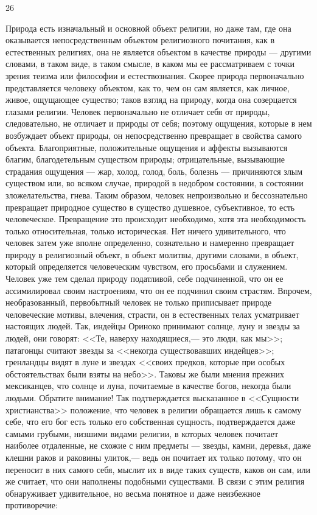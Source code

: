 \documentclass[12pt]{article}
\begin{document}
26

Природа есть изначальный и основной объект религии, но даже там, где она оказывается непосредственным объектом религиозного почитания, как в естественных религиях, она не является объектом в качестве природы --- другими словами, в таком виде, в таком смысле, в каком мы ее рассматриваем с точки зрения теизма или философии и естествознания. Скорее природа первоначально представляется человеку объектом, как то, чем он сам является, как личное, живое, ощущающее существо; таков взгляд на природу, когда она созерцается глазами религии. Человек первоначально не отличает себя от природы, следовательно, не отличает и природы от себя; поэтому ощущения, которые в нем возбуждает объект природы, он непосредственно превращает в свойства самого объекта. Благоприятные, положительные ощущения и аффекты вызываются благим, благодетельным существом природы; отрицательные, вызывающие страдания ощущения --- жар, холод, голод, боль, болезнь --- причиняются злым существом или, во всяком случае, природой в недобром состоянии, в состоянии зложелательства, гнева. Таким образом, человек непроизвольно и бессознательно превращает природное существо в существо душевное, субъективное, то есть человеческое. Превращение это происходит необходимо, хотя эта необходимость только относительная, только историческая. Нет ничего удивительного, что человек затем уже вполне определенно, сознательно и намеренно превращает природу в религиозный объект, в объект молитвы, другими словами, в объект, который определяется человеческим чувством, его просьбами и служением. Человек уже тем сделал природу податливой, себе подчиненной, что он ее ассимилировал своим настроениям, что он ее подчинил своим страстям. Впрочем, необразованный, первобытный человек не только приписывает природе человеческие мотивы, влечения, страсти, он в естественных телах усматривает настоящих людей. Так, индейцы Ориноко принимают солнце, луну и звезды за людей, они говорят: <<Те, наверху находящиеся,--- это люди, как мы>>; патагонцы считают звезды за <<некогда существовавших индейцев>>; гренландцы видят в луне и звездах <<своих предков, которые при особых обстоятельствах были взяты на небо>>. Таковы же были мнения прежних мексиканцев, что солнце и луна, почитаемые в качестве богов, некогда были людьми. Обратите внимание! Так подтверждается высказанное в <<Сущности христианства>> положение, что человек в религии обращается лишь к самому себе, что его бог есть только его собственная сущность, подтверждается даже самыми грубыми, низшими видами религии, в которых человек почитает наиболее отдаленные, не схожие с ним предметы --- звезды, камни, деревья, даже клешни раков и раковины улиток,--- ведь он почитает их только потому, что он переносит в них самого себя, мыслит их в виде таких существ, каков он сам, или же считает, что они наполнены подобными существами. В связи с этим религия обнаруживает удивительное, но весьма понятное и даже неизбежное противоречие:
\end{document}
